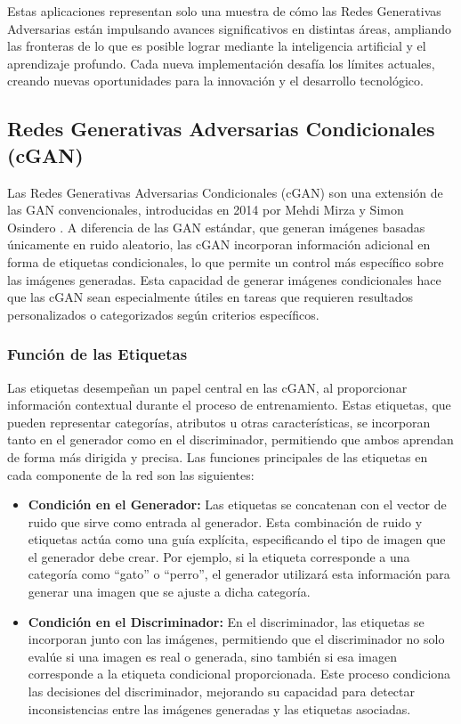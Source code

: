 Estas aplicaciones representan solo una muestra de cómo las Redes Generativas Adversarias están impulsando avances significativos en distintas áreas, ampliando las fronteras de lo que es posible lograr mediante la inteligencia artificial y el aprendizaje profundo. Cada nueva implementación desafía los límites actuales, creando nuevas oportunidades para la innovación y el desarrollo tecnológico. \cite{aws-gan}


\subsection{Redes Generativas Adversarias Condicionales (cGAN)}
Las Redes Generativas Adversarias Condicionales (cGAN) son una extensión de las GAN convencionales, introducidas en 2014 por Mehdi Mirza y Simon Osindero \cite{datascientest-cgan}. A diferencia de las GAN estándar, que generan imágenes basadas únicamente en ruido aleatorio, las cGAN incorporan información adicional en forma de etiquetas condicionales, lo que permite un control más específico sobre las imágenes generadas. Esta capacidad de generar imágenes condicionales hace que las cGAN sean especialmente útiles en tareas que requieren resultados personalizados o categorizados según criterios específicos.

\subsubsection{Función de las Etiquetas}

Las etiquetas desempeñan un papel central en las cGAN, al proporcionar información contextual durante el proceso de entrenamiento. Estas etiquetas, que pueden representar categorías, atributos u otras características, se incorporan tanto en el generador como en el discriminador, permitiendo que ambos aprendan de forma más dirigida y precisa. Las funciones principales de las etiquetas en cada componente de la red son las siguientes:

\begin{itemize} 
    \item \textbf{Condición en el Generador:} Las etiquetas se concatenan con el vector de ruido que sirve como entrada al generador. Esta combinación de ruido y etiquetas actúa como una guía explícita, especificando el tipo de imagen que el generador debe crear. Por ejemplo, si la etiqueta corresponde a una categoría como ``gato'' o ``perro'', el generador utilizará esta información para generar una imagen que se ajuste a dicha categoría.
    \item \textbf{Condición en el Discriminador:} En el discriminador, las etiquetas se incorporan junto con las imágenes, permitiendo que el discriminador no solo evalúe si una imagen es real o generada, sino también si esa imagen corresponde a la etiqueta condicional proporcionada. Este proceso condiciona las decisiones del discriminador, mejorando su capacidad para detectar inconsistencias entre las imágenes generadas y las etiquetas asociadas.
\end{itemize}


